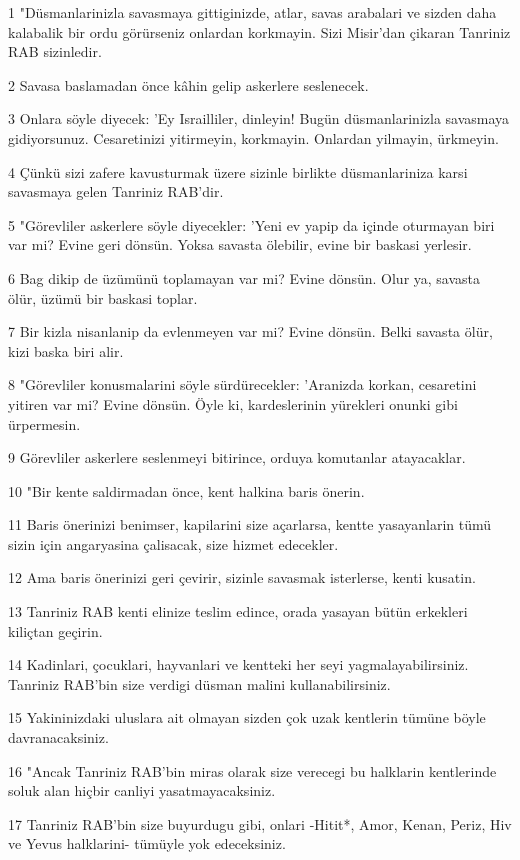 \par 1 "Düsmanlarinizla savasmaya gittiginizde, atlar, savas arabalari ve sizden daha kalabalik bir ordu görürseniz onlardan korkmayin. Sizi Misir'dan çikaran Tanriniz RAB sizinledir.
\par 2 Savasa baslamadan önce kâhin gelip askerlere seslenecek.
\par 3 Onlara söyle diyecek: 'Ey Israilliler, dinleyin! Bugün düsmanlarinizla savasmaya gidiyorsunuz. Cesaretinizi yitirmeyin, korkmayin. Onlardan yilmayin, ürkmeyin.
\par 4 Çünkü sizi zafere kavusturmak üzere sizinle birlikte düsmanlariniza karsi savasmaya gelen Tanriniz RAB'dir.
\par 5 "Görevliler askerlere söyle diyecekler: 'Yeni ev yapip da içinde oturmayan biri var mi? Evine geri dönsün. Yoksa savasta ölebilir, evine bir baskasi yerlesir.
\par 6 Bag dikip de üzümünü toplamayan var mi? Evine dönsün. Olur ya, savasta ölür, üzümü bir baskasi toplar.
\par 7 Bir kizla nisanlanip da evlenmeyen var mi? Evine dönsün. Belki savasta ölür, kizi baska biri alir.
\par 8 "Görevliler konusmalarini söyle sürdürecekler: 'Aranizda korkan, cesaretini yitiren var mi? Evine dönsün. Öyle ki, kardeslerinin yürekleri onunki gibi ürpermesin.
\par 9 Görevliler askerlere seslenmeyi bitirince, orduya komutanlar atayacaklar.
\par 10 "Bir kente saldirmadan önce, kent halkina baris önerin.
\par 11 Baris önerinizi benimser, kapilarini size açarlarsa, kentte yasayanlarin tümü sizin için angaryasina çalisacak, size hizmet edecekler.
\par 12 Ama baris önerinizi geri çevirir, sizinle savasmak isterlerse, kenti kusatin.
\par 13 Tanriniz RAB kenti elinize teslim edince, orada yasayan bütün erkekleri kiliçtan geçirin.
\par 14 Kadinlari, çocuklari, hayvanlari ve kentteki her seyi yagmalayabilirsiniz. Tanriniz RAB'bin size verdigi düsman malini kullanabilirsiniz.
\par 15 Yakininizdaki uluslara ait olmayan sizden çok uzak kentlerin tümüne böyle davranacaksiniz.
\par 16 "Ancak Tanriniz RAB'bin miras olarak size verecegi bu halklarin kentlerinde soluk alan hiçbir canliyi yasatmayacaksiniz.
\par 17 Tanriniz RAB'bin size buyurdugu gibi, onlari -Hitit*, Amor, Kenan, Periz, Hiv ve Yevus halklarini- tümüyle yok edeceksiniz.
